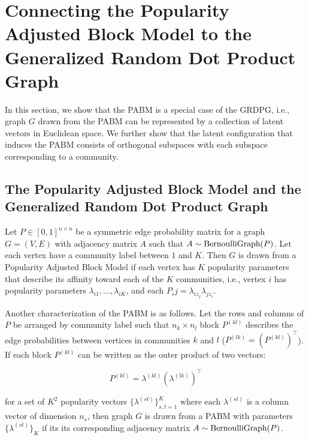 \documentclass[12pt]{article}
\begin{document}
\hypertarget{connecting-the-popularity-adjusted-block-model-to-the-generalized-random-dot-product-graph}{%
\section{Connecting the Popularity Adjusted Block Model to the
Generalized Random Dot Product
Graph}\label{connecting-the-popularity-adjusted-block-model-to-the-generalized-random-dot-product-graph}}

In this section, we show that the PABM is a special case of the GRDPG, i.e.,
graph $G$ drawn from the PABM can be represented by a collection of latent
vectors in Euclidean space. We further show that the latent configuration that
induces the PABM consists of orthogonal subspaces with each subspace
corresponding to a community.

\hypertarget{the-popularity-adjusted-block-model-and-the-generalized-random-dot-product-graph}{%
\subsection{The Popularity Adjusted Block Model and the Generalized
Random Dot Product
Graph}\label{the-popularity-adjusted-block-model-and-the-generalized-random-dot-product-graph}}

\begin{definition}
\label{pabm}
Let $P \in [0, 1]^{n \times n}$ be a symmetric edge probability matrix for a
graph $G = (V, E)$ with adjacency matrix $A$ such that $A \sim \text{BernoulliGraph}(P)$.
Let each vertex have a community label between $1$ and $K$.
Then $G$ is drawn from a Popularity Adjusted Block Model if
each vertex has $K$ popularity parameters that describe its affinity
toward each of the $K$ communities, i.e., vertex $i$ has popularity parameters
$\lambda_{i1}, ..., \lambda_{iK}$, and
each $P_ij = \lambda_{i z_j} \lambda_{j z_i}$.

Another characterization of the PABM is as follows.
Let the rows and columns of $P$ be arranged by community label
such that $n_k \times n_l$ block $P^{(kl)}$
describes the edge probabilities between vertices in communities
$k$ and $l$ ($P^{(lk)} = (P^{(kl)})^\top$).
If each block $P^{(kl)}$ can be written as the outer product of two vectors:

\begin{equation} \label{eq:pabm}
  P^{(kl)} = \lambda^{(kl)} (\lambda^{(lk)})^\top
\end{equation}

for a set of $K^2$ popularity vectors $\{\lambda^{(st)}\}_{s, t = 1}^K$ where each
$\lambda^{(st)}$ is a column vector of dimension $n_s$, then graph $G$ is drawn from a PABM with parameters $\{\lambda^{(st)}\}_K$ if its its corresponding adjacency matrix $A \sim \text{BernoulliGraph}(P)$.
\end{definition}
\end{document}
